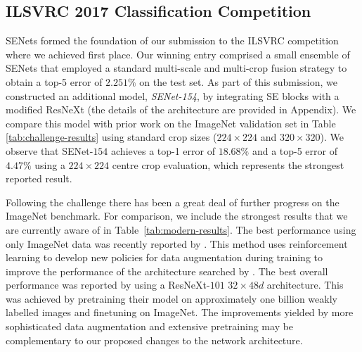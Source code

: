 \vspace{5pt}
\subsection{ILSVRC 2017 Classification Competition} \label{sec:ilsvrc}


SENets formed the foundation of our submission to the ILSVRC competition where we achieved first place. Our winning entry comprised a small ensemble of SENets that employed a standard multi-scale and multi-crop fusion strategy to obtain a top-5 error of $2.251\%$ on the test set.  As part of this submission, we constructed an additional model, {\mbox {\it SENet-154}}, by integrating SE blocks with a modified ResNeXt \cite{xie_cvpr2017resnext} (the details of the architecture are provided in Appendix).  We compare this model with prior work on the ImageNet validation set in Table \ref{tab:challenge-results} using standard crop sizes ($224 \times 224$ and $320 \times 320$).  We observe that SENet-$154$ achieves a top-1 error of $18.68\%$  and a top-5 error of $4.47\%$ using a $224 \times 224$ centre crop evaluation, which represents the strongest reported result.

Following the challenge there has been a great deal of further progress on the ImageNet benchmark. For comparison, we include the strongest results that we are currently aware of %
in Table~\ref{tab:modern-results}.  The best performance using only ImageNet data was recently reported by \cite{cubuk_2018autoaugment}.  This method uses reinforcement learning to develop new policies for data augmentation during training to improve the performance of the architecture searched by \cite{real_2018a}.  The best overall performance was reported by \cite{mahajan_eccv2018exploring} using a ResNeXt-$101$ $32 \times 48d$ architecture. This was achieved by pretraining their model on approximately one billion weakly labelled images and finetuning on ImageNet.  The improvements yielded by more sophisticated data augmentation \cite{cubuk_2018autoaugment} and extensive pretraining \cite{mahajan_eccv2018exploring} may be complementary to our proposed changes to the network architecture.